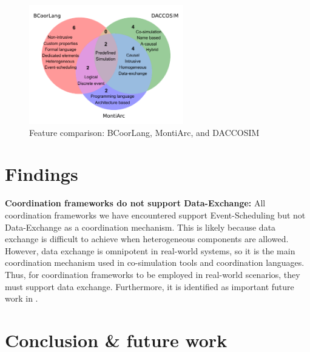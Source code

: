 \documentclass[runningheads]{llncs}
\begin{document}
\begin{figure}[ht]
	\centering
	\includegraphics[width=0.6\textwidth]{images/venn_daccosim}
	\caption{Feature comparison: BCoorLang, MontiArc, and DACCOSIM}
	\label{fig:venn-DACCOSIM}
\end{figure}


\section{Findings} \label{sec:findings}





\textbf{Coordination frameworks do not support Data-Exchange:} All coordination frameworks we have encountered support \textsf{Event-Scheduling} but not \textsf{Data-Exchange} as a coordination mechanism.
This is likely because data exchange is difficult to achieve when heterogeneous components are allowed.
However, data exchange is omnipotent in real-world systems, so it is the main coordination mechanism used in co-simulation tools and coordination languages.
Thus, for coordination frameworks to be employed in real-world scenarios, they must support data exchange.
Furthermore, it is identified as important future work in \cite{krauterBehavioralConsistencyMultimodeling2023,varalarsenBCOolBehavioralCoordination2016}.

\section{Conclusion \& future work} \label{sec:conclusion}



\end{document}
